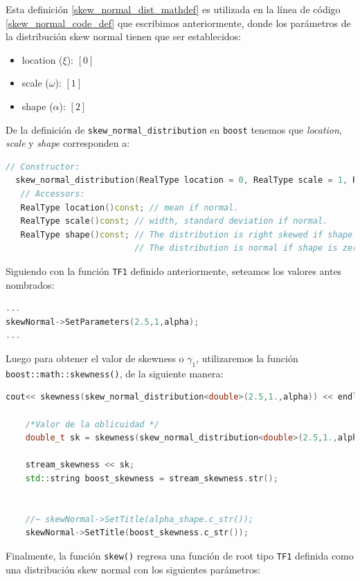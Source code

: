 \documentclass[11pt,letterpaper]{article}
\begin{document}
Esta definición \eqref{skew_normal_dist_mathdef} es utilizada en la línea de código \eqref{skew_normal_code_def} que escribimos anteriormente, donde los parámetros de la distribución skew normal tienen que ser establecidos:

\begin{itemize}
\item location ($\xi$): $[0]$
\item scale ($\omega$): $[1]$
\item shape ($\alpha$): $[2]$
\end{itemize}


De la definición de \verb|skew_normal_distribution| en \verb|boost| tenemos que \textit{location}, \textit{scale} y \textit{shape} corresponden a:


\begin{lstlisting}[language=c++]
// Constructor:
  skew_normal_distribution(RealType location = 0, RealType scale = 1, RealType shape = 0);
   // Accessors:
   RealType location()const; // mean if normal.
   RealType scale()const; // width, standard deviation if normal.
   RealType shape()const; // The distribution is right skewed if shape > 0 and is left skewed if shape < 0.
                          // The distribution is normal if shape is zero.
\end{lstlisting}

Siguiendo con la función \verb|TF1| definido anteriormente, seteamos los valores antes nombrados:

\begin{lstlisting}[language=c++]
...
skewNormal->SetParameters(2.5,1,alpha);
...
\end{lstlisting}

Luego para obtener el valor de skewness o $\gamma_1$, utilizaremos la función \verb|boost::math::skewness()|, de la siguiente manera:

\begin{lstlisting}[language=c++]
cout<< skewness(skew_normal_distribution<double>(2.5,1.,alpha)) << endl;

    /*Valor de la oblicuidad */
	double_t sk = skewness(skew_normal_distribution<double>(2.5,1.,alpha));

	stream_skewness << sk;
	std::string boost_skewness = stream_skewness.str();
	
	
	//~ skewNormal->SetTitle(alpha_shape.c_str());
	skewNormal->SetTitle(boost_skewness.c_str());
\end{lstlisting}

Finalmente, la función \verb|skew()| regresa una función de root tipo \verb|TF1| definida como una distribución skew normal con los siguientes parámetros:
\end{document}
